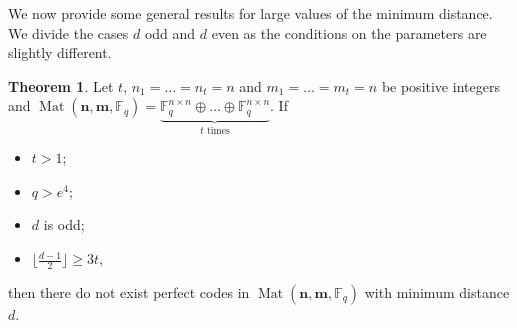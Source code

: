 \documentclass[11pt]{amsart}
\DeclareMathOperator{\Mat}{Mat}
\theoremstyle{definition}
\newtheorem{theorem}{Theorem}[section]
\newcommand{\F}{{\mathbb F}}
\newcommand{\bfn}{\mathbf {n}}
\newcommand{\bfm}{\mathbf {m}}
\newcommand{\spacmn}{\Mat(\bfn,\bfm,\F_q)}
\begin{document}
We now provide some general results for large values of the minimum distance. We divide the cases $d$ odd and $d$ even as the conditions on the parameters are slightly different.

\begin{theorem}\label{thm:dlarg1}
Let $t$, $ n_1 = \ldots = n_t = n $ and $ m_1 = \ldots = m_t = n $ be positive integers and $\spacmn=\underbrace{\mathbb{F}_q^{n\times n}\oplus \ldots \oplus \F_q^{n\times n}}_{t \text{ times}}$.
If 
\begin{itemize}
    \item $t>1$;
    \item $q>e^4$;
    \item $d$ is odd;
    \item $\lfloor \frac{d-1}2\rfloor\geq 3t$,
\end{itemize}
then there do not exist perfect codes in $\spacmn$ with minimum distance $d$.
\end{theorem}
\end{document}
